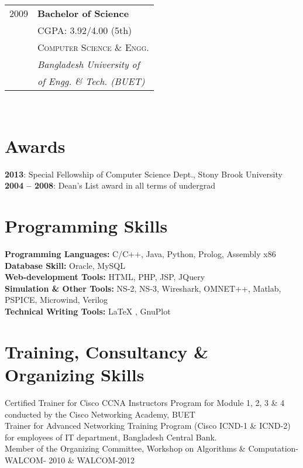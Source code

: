 \documentclass[10pt]{article} %
\begin{document}
\begin{minipage}[t]{0.44\textwidth}
\begin{tabular}{rl}
2009 & \textbf{Bachelor of Science} \\ 
& \small CGPA: 3.92/4.00 (5th) \\
& \textsc{Computer Science \& Engg.} \\ 
& \textit{Bangladesh University of}\\
& \textit{of Engg. \& Tech. (BUET)} \\
\end{tabular}\\[10pt]
\section{Awards} 
\textbf{2013}: Special Fellowship of Computer Science Dept., Stony Brook
University\\
\textbf{2004 -- 2008}: Dean's List award in all terms of undergrad
\section{Programming Skills}
	\bullet{ }\textbf{Programming Languages: } C/C++, Java, Python, Prolog,
	Assembly x86 \\ 
	\bullet{ }\textbf{Database Skill: }Oracle, MySQL \\
	\bullet{ }\textbf{Web-development Tools: }HTML, PHP, JSP, JQuery\\
	\bullet{ }\textbf{Simulation \& Other Tools: }NS-2, NS-3, Wireshark, OMNET++,
	Matlab, PSPICE, Microwind, Verilog\\
	 \bullet{ }\textbf{Technical Writing Tools: }\LaTeX{ },
	GnuPlot
\section{Training, Consultancy \& Organizing Skills}
	\bullet{ } Certified Trainer for Cisco CCNA Instructor\textquotesingle{}s
	Program for Module 1, 2, 3 \& 4 conducted by the Cisco Networking Academy, BUET
	\\ \bullet{ }  Trainer for Advanced Networking Training Program (Cisco ICND-1
	\& ICND-2) for employees of IT department, Bangladesh Central Bank.
	\\ \bullet{ } Member of the Organizing Committee, Workshop on Algorithms \&
	Computation- WALCOM- 2010 \& WALCOM-2012 

	
\end{minipage} %
\end{document}

